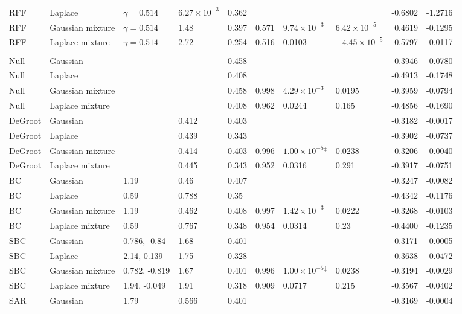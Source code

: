 \begin{longtable}{llllllllrr}
RFF & Laplace & $\gamma=0.514$ & $6.27\times10^{-3}$ & 0.362 &  &  &  & -0.6802 & -1.2716 \\
RFF & Gaussian mixture & $\gamma=0.514$ & 1.48 & 0.397 & 0.571 & $9.74\times10^{-3}$ & $6.42\times10^{-5}$ & 0.4619 & -0.1295 \\
RFF & Laplace mixture & $\gamma=0.514$ & 2.72 & 0.254 & 0.516 & 0.0103 & $-4.45\times10^{-5}$ & 0.5797 & -0.0117 \\
\midrule
\multicolumn{10}{l}{\spinos{}} \\
Null & Gaussian &  &  & 0.458 &  &  &  & -0.3946 & -0.0780 \\
Null & Laplace &  &  & 0.408 &  &  &  & -0.4913 & -0.1748 \\
Null & Gaussian mixture &  &  & 0.458 & 0.998 & $4.29\times10^{-3}$ & 0.0195 & -0.3959 & -0.0794 \\
Null & Laplace mixture &  &  & 0.408 & 0.962 & 0.0244 & 0.165 & -0.4856 & -0.1690 \\
DeGroot & Gaussian &  & 0.412 & 0.403 &  &  &  & -0.3182 & -0.0017 \\
DeGroot & Laplace &  & 0.439 & 0.343 &  &  &  & -0.3902 & -0.0737 \\
DeGroot & Gaussian mixture &  & 0.414 & 0.403 & 0.996 & $1.00\times10^{-5}$$^{\ddagger}$ & 0.0238 & -0.3206 & -0.0040 \\
DeGroot & Laplace mixture &  & 0.445 & 0.343 & 0.952 & 0.0316 & 0.291 & -0.3917 & -0.0751 \\
BC & Gaussian & 1.19 & 0.46 & 0.407 &  &  &  & -0.3247 & -0.0082 \\
BC & Laplace & 0.59 & 0.788 & 0.35 &  &  &  & -0.4342 & -0.1176 \\
BC & Gaussian mixture & 1.19 & 0.462 & 0.408 & 0.997 & $1.42\times10^{-3}$ & 0.0222 & -0.3268 & -0.0103 \\
BC & Laplace mixture & 0.59 & 0.767 & 0.348 & 0.954 & 0.0314 & 0.23 & -0.4400 & -0.1235 \\
SBC & Gaussian & 0.786, -0.84 & 1.68 & 0.401 &  &  &  & -0.3171 & -0.0005 \\
SBC & Laplace & 2.14, 0.139 & 1.75 & 0.328 &  &  &  & -0.3638 & -0.0472 \\
SBC & Gaussian mixture & 0.782, -0.819 & 1.67 & 0.401 & 0.996 & $1.00\times10^{-5}$$^{\ddagger}$ & 0.0238 & -0.3194 & -0.0029 \\
SBC & Laplace mixture & 1.94, -0.049 & 1.91 & 0.318 & 0.909 & 0.0717 & 0.215 & -0.3567 & -0.0402 \\
SAR & Gaussian & 1.79 & 0.566 & 0.401 &  &  &  & -0.3169 & -0.0004 \\

\end{longtable}
